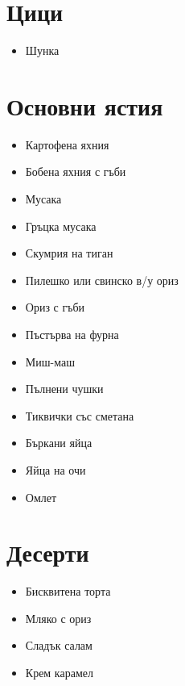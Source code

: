 \documentclass{article}
\begin{document}
\begin{multicols}{3}
\section{Цици}
\begin{itemize}
    \item{Шунка}
\end{itemize}

\section{Основни ястия}
\begin{itemize}
    \item{Картофена яхния}
    \item{Бобена яхния с гъби}
    \item{Мусака}
    \item{Гръцка мусака}
    \item{Скумрия на тиган}
    \item{Пилешко или свинско в/у ориз}
    \item{Ориз с гъби}
    \item{Пъстърва на фурна}
    \item{Миш-маш}
    \item{Пълнени чушки}
    \item{Тиквички със сметана}
    \item{Бъркани яйца}
    \item{Яйца на очи}
    \item{Омлет}
\end{itemize}

\section{Десерти}
\begin{itemize}
    \item{Бисквитена торта}
    \item{Мляко с ориз}
    \item{Сладък салам}
    \item{Крем карамел}
\end{itemize}
\end{multicols}
\end{document}
